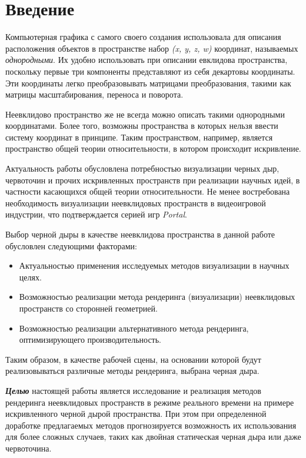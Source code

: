 \section{Введение}
\label{sec:Chapter0} 

Компьютерная графика с самого своего создания использовала для описания расположения объектов в пространстве набор \textit{(x, y, z, w)} координат, называемых \textit{однородными}. Их удобно использовать при описании евклидова пространства, поскольку первые три компоненты представляют из себя декартовы координаты. Эти координаты легко преобразовывать матрицами преобразования, такими как матрицы масштабирования, переноса и поворота.

Неевклидово пространство же не всегда можно описать такими однородными координатами. Более того, возможны пространства в которых нельзя ввести систему координат в принципе. Таким пространством, например, является пространство общей теории относительности, в котором происходит искривление.

Актуальность работы обусловлена потребностью визуализации черных дыр, червоточин и прочих искривленных пространств при реализации научных идей, в частности касающихся общей теории относительности. Не менее востребована необходимость визуализации неевклидовых пространств в видеоигровой индустрии, что подтверждается серией игр \textit{Portal}.

Выбор черной дыры в качестве неевклидова пространства в данной работе обусловлен следующими факторами:
\begin{itemize}
  \item Актуальностью применения исследуемых методов визуализации в научных целях.
  \item Возможностью реализации метода рендеринга (визуализации) неевклидовых пространств со сторонней геометрией.
  \item Возможностью реализации альтернативного метода рендеринга, оптимизирующего производительность.
\end{itemize}

Таким образом, в качестве рабочей сцены, на основании которой будут реализовываться различные методы рендеринга, выбрана черная дыра.

\textbf{\textit{Целью}} настоящей работы является исследование и реализация методов рендеринга неевклидовых пространств в режиме реального времени на примере искривленного черной дырой пространства. При этом при определенной доработке предлагаемых методов прогнозируется возможность их использования для более сложных случаев, таких как двойная статическая черная дыра или даже червоточина.

